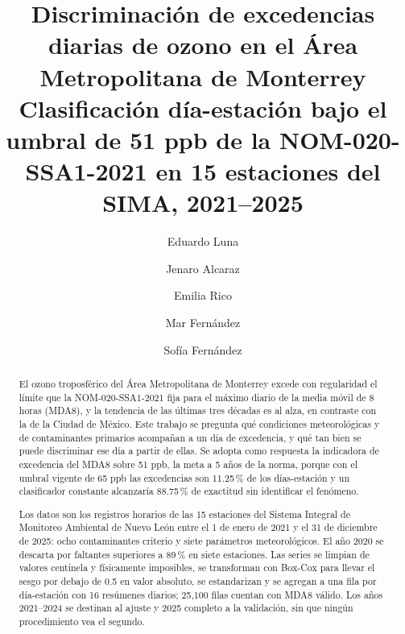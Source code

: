 \documentclass[5p,nonatbib]{elsarticle}
\begin{document}
\begin{frontmatter}

\title{Discriminación de excedencias diarias de ozono en el Área Metropolitana
de Monterrey\\
\large Clasificación día-estación bajo el umbral de 51 ppb de la
NOM-020-SSA1-2021 en 15 estaciones del SIMA, 2021--2025}

\author[tec]{Eduardo Luna}
\author[tec]{Jenaro Alcaraz}
\author[tec]{Emilia Rico}
\author[tec]{Mar Fernández}
\author[tec]{Sofía Fernández}
\address[tec]{Instituto Tecnológico y de Estudios Superiores de Monterrey, MA2003B --- Grupo 102, equipo 7}

\begin{abstract}
El ozono troposférico del Área Metropolitana de Monterrey excede con
regularidad el límite que la NOM-020-SSA1-2021 fija para el máximo diario de
la media móvil de 8 horas (MDA8), y la tendencia de las últimas tres décadas
es al alza, en contraste con la de la Ciudad de México. Este trabajo se
pregunta qué condiciones meteorológicas y de contaminantes primarios
acompañan a un día de excedencia, y qué tan bien se puede discriminar ese día
a partir de ellas. Se adopta como respuesta la indicadora de excedencia del
MDA8 sobre 51 ppb, la meta a 5 años de la norma, porque con el umbral vigente
de 65 ppb las excedencias son 11.25\,\% de los días-estación y un
clasificador constante alcanzaría 88.75\,\% de exactitud sin identificar el
fenómeno.

Los datos son los registros horarios de las 15 estaciones del Sistema
Integral de Monitoreo Ambiental de Nuevo León entre el 1 de enero de 2021 y
el 31 de diciembre de 2025: ocho contaminantes criterio y siete parámetros
meteorológicos. El año 2020 se descarta por faltantes superiores a 89\,\% en
siete estaciones. Las series se limpian de valores centinela y físicamente
imposibles, se transforman con Box-Cox para llevar el sesgo por debajo de
0.5 en valor absoluto, se estandarizan y se agregan a una fila por
día-estación con 16 resúmenes diarios; 25,100 filas cuentan con MDA8 válido.
Los años 2021--2024 se destinan al ajuste y 2025 completo a la validación,
sin que ningún procedimiento vea el segundo.


\end{abstract}
\end{frontmatter}
\end{document}
